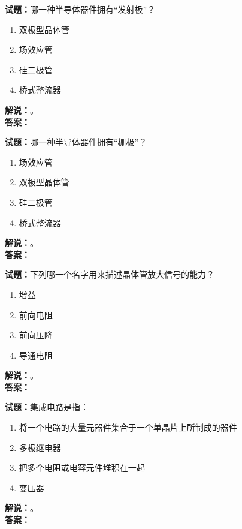 \documentclass{ctexbook}
\begin{document}
\bigskip




\noindent\textbf{试题：}哪一种半导体器件拥有“发射极”？
\begin{enumerate}[leftmargin=3em]
\item 双极型晶体管
\item 场效应管
\item 硅二极管
\item 桥式整流器
\end{enumerate}
\noindent\textbf{解说：}\textbf{}。\\\noindent\textbf{答案：}

\bigskip




\noindent\textbf{试题：}哪一种半导体器件拥有“栅极”？
\begin{enumerate}[leftmargin=3em]
\item 场效应管
\item 双极型晶体管
\item 硅二极管
\item 桥式整流器
\end{enumerate}
\noindent\textbf{解说：}\textbf{}。\\\noindent\textbf{答案：}

\bigskip




\noindent\textbf{试题：}下列哪一个名字用来描述晶体管放大信号的能力？
\begin{enumerate}[leftmargin=3em]
\item 增益
\item 前向电阻
\item 前向压降
\item 导通电阻
\end{enumerate}
\noindent\textbf{解说：}\textbf{}。\\\noindent\textbf{答案：}

\bigskip




\noindent\textbf{试题：}集成电路是指：
\begin{enumerate}[leftmargin=3em]
\item 将一个电路的大量元器件集合于一个单晶片上所制成的器件
\item 多极继电器
\item 把多个电阻或电容元件堆积在一起
\item 变压器
\end{enumerate}
\noindent\textbf{解说：}\textbf{}。\\\noindent\textbf{答案：}
\end{document}
